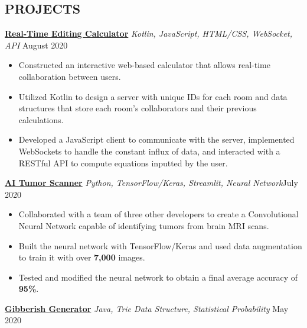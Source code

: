 \documentclass[11pt]{res}
\begin{document}
\begin{footnotesize}
\begin{resume}
\begin{small}
\section{PROJECTS}
\end{small} 
\vspace{.5mm}
\href{https://github.com/CharlesShi12/CalcShare}{\textbf{Real-Time Editing Calculator}} {\sl Kotlin, JavaScript, HTML/CSS, WebSocket, API} \hfill August 2020\vspace{-4.75mm}
\begin{itemize} \itemsep -2pt 
\item Constructed an interactive web-based calculator that allows real-time collaboration between users. 
\vspace{1mm}
\item Utilized Kotlin to design a server with unique IDs for each room and data structures that store each room's collaborators and their previous calculations.
\vspace{1mm}
\item Developed a JavaScript client to communicate with the server, implemented WebSockets to handle the constant influx of data, and interacted with a RESTful API to compute equations inputted by the user.  
\end{itemize}
\vspace{-2.5mm}
\href{https://github.com/CharlesShi12/AI_Tumor_Scanner}{\textbf{AI Tumor Scanner}} {\sl Python, TensorFlow/Keras, Streamlit, Neural Network}\hfill July 2020\vspace{-4.75mm}
\begin{itemize} \itemsep -2pt 
\item Collaborated with a team of three other developers to create a Convolutional Neural Network capable of identifying tumors from brain MRI scans. 
\vspace{1mm}
\item Built the neural network with TensorFlow/Keras and used data augmentation to train it with over \textbf{7,000} images.
\vspace{1mm}
\item Tested and modified the neural network to obtain a final average accuracy of \textbf{95\%}.
\end{itemize}
\vspace{-2.5mm}
\href{https://github.com/CharlesShi12/GibberishGenerator}{\textbf{Gibberish Generator}} {\sl Java, Trie Data Structure, Statistical Probability} \hfill May 2020\vspace{-4.75mm}
\begin{itemize} \itemsep -2pt 

\end{itemize}
\end{resume}
\end{footnotesize}
\end{document}
